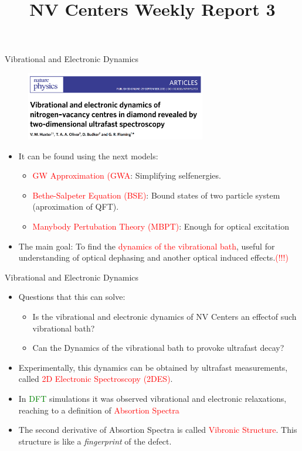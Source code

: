 \documentclass[11pt]{beamer}
\begin{document}
\title[NV-WR3]{NV Centers Weekly Report 3} 
\begin{frame}
\titlepage 
\end{frame}
\begin{frame}{Vibrational and Electronic Dynamics}
\begin{figure}
 \centering
    \includegraphics[width=0.7\textwidth]{pap6.png}
 \end{figure}
  \begin{itemize}
     \item It can be found using the next models:
     \begin{itemize}
         \item \textcolor{red}{GW Approximation (GWA}: Simplifying selfenergies.
         \item \textcolor{red}{Bethe-Salpeter Equation (BSE)}: Bound states of two particle system (aproximation of QFT).
         \item \textcolor{red}{Manybody Pertubation Theory (MBPT)}: Enough for optical excitation
     \end{itemize}
     \item The main goal: To find the \textcolor{red} {dynamics of the vibrational bath}, useful for understanding of optical dephasing and another optical induced effects.\textcolor{red}{(!!!)}
 \end{itemize}
\end{frame}
\begin{frame}{Vibrational and Electronic Dynamics}
\begin{itemize}
    \item Questions that this can solve:
    \begin{itemize}
        \item Is the vibrational and electronic dynamics of NV Centers an effectof such vibrational bath?
        \item Can the Dynamics of the vibrational bath to provoke ultrafast decay?
    \end{itemize}
    \item Experimentally, this dynamics can  be obtained by ultrafast measurements, called \textcolor{red}{2D Electronic Spectroscopy (2DES)}.
    \item In \textcolor{green}{DFT} simulations it was observed vibrational and electronic relaxations, reaching to a definition of \textcolor{red}{Absortion Spectra}
    \item The second derivative of Absortion Spectra is called \textcolor{red}{Vibronic Structure}. This structure is like a \textit{fingerprint} of the defect.
\end{itemize}
\end{frame}
\end{document}
